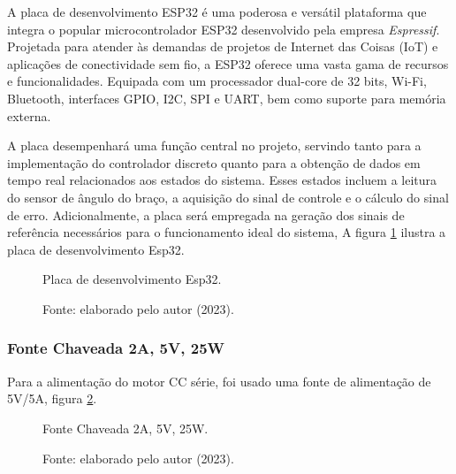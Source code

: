 A placa de desenvolvimento ESP32 é uma poderosa e versátil plataforma que integra o popular microcontrolador ESP32 desenvolvido pela empresa  \textit{Espressif}. Projetada para atender às demandas de projetos de Internet das Coisas (IoT) e aplicações de conectividade sem fio, a ESP32 oferece uma vasta gama de recursos e funcionalidades. Equipada com um processador dual-core de 32 bits, Wi-Fi, Bluetooth, interfaces GPIO, I2C, SPI e UART, bem como suporte para memória externa.

A placa desempenhará uma função central no projeto, servindo tanto para a implementação do controlador discreto quanto para a obtenção de dados em tempo real relacionados aos estados do sistema. Esses estados incluem a leitura do sensor de ângulo do braço, a aquisição do sinal de controle e o cálculo do sinal de erro. Adicionalmente, a placa será empregada na geração dos sinais de referência necessários para o funcionamento ideal do sistema, A figura \ref{fig3:image_05} ilustra a placa de desenvolvimento Esp32.

\begin{figure}[!h]
	\centering
	\caption{Placa de desenvolvimento Esp32.}
	\caption*{Fonte: elaborado pelo autor (2023).}
	\label{fig3:image_05}
\end{figure}


\subsubsection{Fonte Chaveada 2A, 5V, 25W}

Para a alimentação do motor CC série, foi usado uma fonte de alimentação de 5V/5A, figura \ref{fig3:image_06}.

\begin{figure}[!h]
	\centering
	\caption{Fonte Chaveada 2A, 5V, 25W.}
	\caption*{Fonte: elaborado pelo autor (2023).}
	\label{fig3:image_06}
\end{figure}



